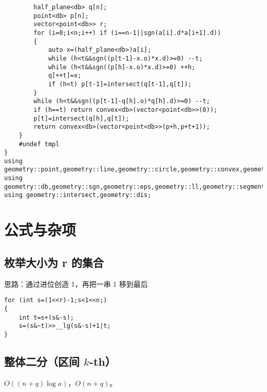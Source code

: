 \documentclass[12pt]{ctexart}
\begin{document}
\begin{lstlisting}
		half_plane<db> q[n];
		point<db> p[n];
		vector<point<db>> r;
		for (i=0;i<n;i++) if (i==n-1||sgn(a[i].d*a[i+1].d))
		{
			auto x=(half_plane<db>)a[i];
			while (h<t&&sgn((p[t-1]-x.o)*x.d)>=0) --t;
			while (h<t&&sgn((p[h]-x.o)*x.d)>=0) ++h;
			q[++t]=x;
			if (h<t) p[t-1]=intersect(q[t-1],q[t]);
		}
		while (h<t&&sgn((p[t-1]-q[h].o)*q[h].d)>=0) --t;
		if (h==t) return convex<db>(vector<point<db>>(0));
		p[t]=intersect(q[h],q[t]);
		return convex<db>(vector<point<db>>(p+h,p+t+1));
	}
	#undef tmpl
}
using geometry::point,geometry::line,geometry::circle,geometry::convex,geometry::half_plane;
using geometry::db,geometry::sgn,geometry::eps,geometry::ll,geometry::segment;
using geometry::intersect,geometry::dis;
\end{lstlisting}


\newpage

\section{公式与杂项}

\subsection{枚举大小为 r 的集合}

思路：通过进位创造 1，再把一串 1 移到最后

\begin{lstlisting}
for (int s=(1<<r)-1;s<1<<n;)
{
	int t=s+(s&-s);
	s=(s&~t)>>__lg(s&-s)+1|t;
}
\end{lstlisting}

\subsection{整体二分（区间 $k$-th）}

$O((n+q)\log a)$，$O(n+q)$。
\end{document}

